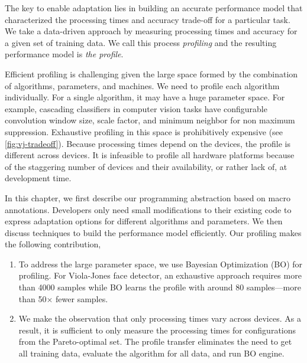 The key to enable adaptation lies in building an accurate performance model that
characterized the processing times and accuracy trade-off for a particular
task. We take a data-driven approach by measuring processing times and accuracy
for a given set of training data. We call this process \emph{profiling} and the
resulting performance model is \emph{the profile}.

Efficient profiling is challenging given the large space formed by the
combination of algorithms, parameters, and machines. We need to profile each
algorithm individually. For a single algorithm, it may have a huge parameter
space. For example, cascading classifiers in computer vision tasks have
configurable convolution window size, scale factor, and minimum neighbor for non
maximum suppression. Exhaustive profiling in this space is prohibitively
expensive (see \autoref{fig:vj-tradeoff}). Because processing times depend on
the devices, the profile is different across devices. It is infeasible to
profile all hardware platforms because of the staggering number of devices and
their availability, or rather lack of, at development time.

In this chapter, we first describe our programming abstraction based on macro
annotations. Developers only need small modifications to their existing code to
express adaptation options for different algorithms and parameters. We then
discuss techniques to build the performance model efficiently. Our profiling
makes the following contribution,

\begin{enumerate}[noitemsep, topsep=0pt]
\item To address the large parameter space, we use Bayesian Optimization (BO)
  for profiling. For Viola-Jones face detector, an exhaustive approach requires
  more than 4000 samples while BO learns the profile with around 80
  samples---more than 50$\times$ fewer samples.
\item We make the observation that only processing times vary across devices. As
  a result, it is sufficient to only measure the processing times for
  configurations from the Pareto-optimal set. The profile transfer eliminates
  the need to get all training data, evaluate the algorithm for all data, and
  run BO engine.
\end{enumerate}


